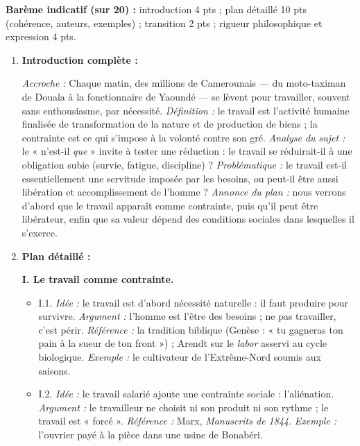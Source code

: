 \documentclass[11pt]{article}
\begin{document}
\begin{corrige}
\textbf{Barème indicatif (sur 20) :} introduction 4 pts ; plan détaillé 10 pts (cohérence, auteurs, exemples) ; transition 2 pts ; rigueur philosophique et expression 4 pts.

\begin{enumerate}
    \item \textbf{Introduction complète :}

    \emph{Accroche :} Chaque matin, des millions de Camerounais — du moto-taximan de Douala à la fonctionnaire de Yaoundé — se lèvent pour travailler, souvent sans enthousiasme, par nécessité. \emph{Définition :} le travail est l'activité humaine finalisée de transformation de la nature et de production de biens ; la contrainte est ce qui s'impose à la volonté contre son gré. \emph{Analyse du sujet :} le « n'est-il \emph{que} » invite à tester une réduction : le travail se réduirait-il à une obligation subie (survie, fatigue, discipline) ? \emph{Problématique :} le travail est-il essentiellement une servitude imposée par les besoins, ou peut-il être aussi libération et accomplissement de l'homme ? \emph{Annonce du plan :} nous verrons d'abord que le travail apparaît comme contrainte, puis qu'il peut être libérateur, enfin que sa valeur dépend des conditions sociales dans lesquelles il s'exerce.

    \item \textbf{Plan détaillé :}

    \textbf{I. Le travail comme contrainte.}
    \begin{itemize}
        \item I.1. \emph{Idée :} le travail est d'abord nécessité naturelle : il faut produire pour survivre. \emph{Argument :} l'homme est l'être des besoins ; ne pas travailler, c'est périr. \emph{Référence :} la tradition biblique (Genèse : « tu gagneras ton pain à la sueur de ton front ») ; Arendt sur le \emph{labor} asservi au cycle biologique. \emph{Exemple :} le cultivateur de l'Extrême-Nord soumis aux saisons.
        \item I.2. \emph{Idée :} le travail salarié ajoute une contrainte sociale : l'aliénation. \emph{Argument :} le travailleur ne choisit ni son produit ni son rythme ; le travail est « forcé ». \emph{Référence :} Marx, \emph{Manuscrits de 1844}. \emph{Exemple :} l'ouvrier payé à la pièce dans une usine de Bonabéri.
    \end{itemize}


\end{enumerate}
\end{corrige}
\end{document}
